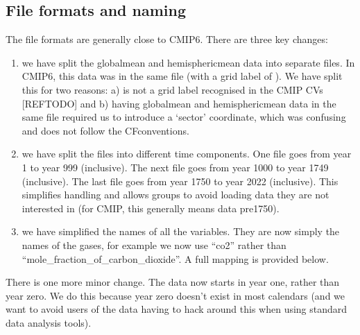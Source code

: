 \documentclass[letterpaper,10pt,english]{jupyterBook}
\begin{document}
\subsection{File formats and naming}
\label{\detokenize{user-guide-historical:file-formats-and-naming}}
\sphinxAtStartPar
The file formats are generally close to CMIP6.
There are three key changes:
\begin{enumerate}
%
\item {}
\sphinxAtStartPar
we have split the global\sphinxhyphen{}mean and hemispheric\sphinxhyphen{}mean data into separate files.
In CMIP6, this data was in the same file (with a grid label of ).
We have split this for two reasons:
a)  is not a grid label recognised in the CMIP CVs {[}REF\sphinxhyphen{}TODO{]} and
b) having global\sphinxhyphen{}mean and hemispheric\sphinxhyphen{}mean data in the same file
required us to introduce a ‘sector’ coordinate,
which was confusing and does not follow the CF\sphinxhyphen{}conventions.

\item {}
\sphinxAtStartPar
we have split the files into different time components.
One file goes from year 1 to year 999 (inclusive).
The next file goes from year 1000 to year 1749 (inclusive).
The last file goes from year 1750 to year 2022 (inclusive).
This simplifies handling and allows groups to avoid loading data
they are not interested in (for CMIP, this generally means data pre\sphinxhyphen{}1750).

\item {}
\sphinxAtStartPar
we have simplified the names of all the variables.
They are now simply the names of the gases,
for example we now use “co2” rather than “mole\_fraction\_of\_carbon\_dioxide”.
A full mapping is provided below.

\end{enumerate}

\sphinxAtStartPar
There is one more minor change.
The data now starts in year one, rather than year zero.
We do this because year zero doesn’t exist in most calendars
(and we want to avoid users of the data having to hack around this
when using standard data analysis tools).
\end{document}
